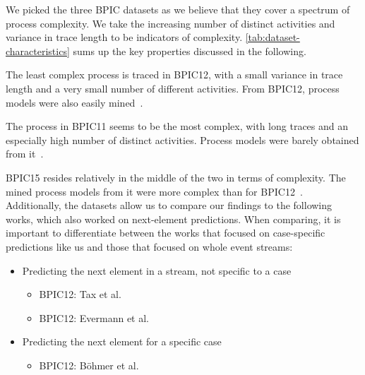 We picked the three BPIC datasets as we believe that they cover a spectrum of process complexity. We take the increasing number of distinct activities and variance in trace length to be indicators of complexity. \autoref{tab:dataset-characteristics} sums up the key properties discussed in the following.

The least complex process is traced in BPIC12, with a small variance in trace length and a very small number of different activities. From BPIC12, process models were also easily mined~\cite{adriansyah2012mining}.

The process in BPIC11 seems to be the most complex, with long traces and an especially high number of distinct activities. Process models were barely obtained from it~\cite{bose2011analysis}.

BPIC15 resides relatively in the middle of the two in terms of complexity. The mined process models from it were more complex than for BPIC12~\cite{van2015benchmarking}.\\

\noindent Additionally, the datasets allow us to compare our findings to the following works, which also worked on next-element predictions. When comparing, it is important to differentiate between the works that focused on case-specific predictions like us and those that focused on whole event streams:

\begin{itemize}
    \item Predicting the next element in a stream, not specific to a case
    \begin{itemize}
        \item BPIC12: Tax et al.~\cite{tax2017}
        \item BPIC12: Evermann et al.~\cite{evermann2016}
    \end{itemize}
    \item Predicting the next element for a specific case
    \begin{itemize}
        \item BPIC12: Böhmer et al.~\cite{boehmer2018probability}
    \end{itemize}
\end{itemize}

